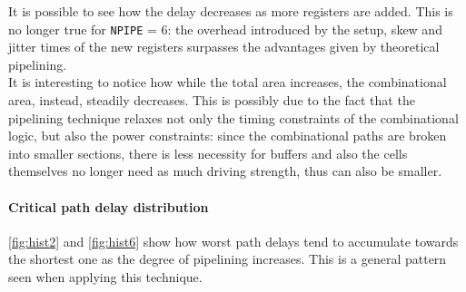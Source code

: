 It is possible to see how the delay decreases as more registers are added. This is no longer true for \texttt{NPIPE} = 6: the overhead introduced by the setup, skew and jitter times of the new registers surpasses the advantages given by theoretical pipelining.\\
It is interesting to notice how while the total area increases, the combinational area, instead, steadily decreases. This is possibly due to the fact that the pipelining technique relaxes not only the timing constraints of the combinational logic, but also the power constraints: since the combinational paths are broken into smaller sections, there is less necessity for buffers and also the cells themselves no longer need as much driving strength, thus can also be smaller.


\paragraph{Critical path delay distribution}
\autoref{fig:hist2} and \autoref{fig:hist6} show how worst path delays tend to accumulate towards the shortest one as the degree of pipelining increases. This is a general pattern seen when applying this technique.
